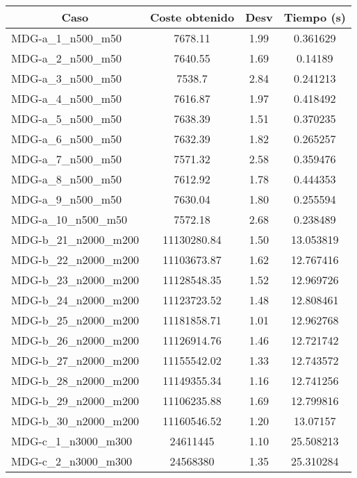 \documentclass[11pt,a4paper]{article}
\begin{document}
\begin{table}[H]
	\begin{center}
		\begin{tabular}{|l|c|c|c|} 
			\hline
			\multicolumn{1}{|c|}{\textbf{Caso}} & \textbf{Coste obtenido} & \textbf{Desv} & \textbf{Tiempo (s)} \\ \hline
		MDG-a\_1\_n500\_m50 & 7678.11 & 1.99 & 0.361629 \\ \hline
		MDG-a\_2\_n500\_m50 & 7640.55 & 1.69 & 0.14189 \\ \hline
		MDG-a\_3\_n500\_m50 & 7538.7 & 2.84 & 0.241213 \\ \hline
		MDG-a\_4\_n500\_m50 & 7616.87 & 1.97 & 0.418492 \\ \hline
		MDG-a\_5\_n500\_m50 & 7638.39 & 1.51 & 0.370235 \\ \hline
		MDG-a\_6\_n500\_m50 & 7632.39 & 1.82 & 0.265257 \\ \hline
		MDG-a\_7\_n500\_m50 & 7571.32 & 2.58 & 0.359476 \\ \hline
		MDG-a\_8\_n500\_m50 & 7612.92 & 1.78 & 0.444353 \\ \hline
		MDG-a\_9\_n500\_m50 & 7630.04 & 1.80 & 0.255594 \\ \hline
		MDG-a\_10\_n500\_m50 & 7572.18 & 2.68 & 0.238489 \\ \hline
		MDG-b\_21\_n2000\_m200 & 11130280.84 & 1.50 & 13.053819 \\ \hline
		MDG-b\_22\_n2000\_m200 & 11103673.87 & 1.62 & 12.767416 \\ \hline
		MDG-b\_23\_n2000\_m200 & 11128548.35 & 1.52 & 12.969726 \\ \hline
		MDG-b\_24\_n2000\_m200 & 11123723.52 & 1.48 & 12.808461 \\ \hline
		MDG-b\_25\_n2000\_m200 & 11181858.71 & 1.01 & 12.962768 \\ \hline
		MDG-b\_26\_n2000\_m200 & 11126914.76 & 1.46 & 12.721742 \\ \hline
		MDG-b\_27\_n2000\_m200 & 11155542.02 & 1.33 & 12.743572 \\ \hline
		MDG-b\_28\_n2000\_m200 & 11149355.34 & 1.16 & 12.741256 \\ \hline
		MDG-b\_29\_n2000\_m200 & 11106235.88 & 1.69 & 12.799816 \\ \hline
		MDG-b\_30\_n2000\_m200 & 11160546.52 & 1.20 & 13.07157 \\ \hline
		MDG-c\_1\_n3000\_m300 & 24611445 & 1.10 & 25.508213 \\ \hline
		MDG-c\_2\_n3000\_m300 & 24568380 & 1.35 & 25.310284 \\ \hline

\end{tabular}
\end{center}
\end{table}
\end{document}
